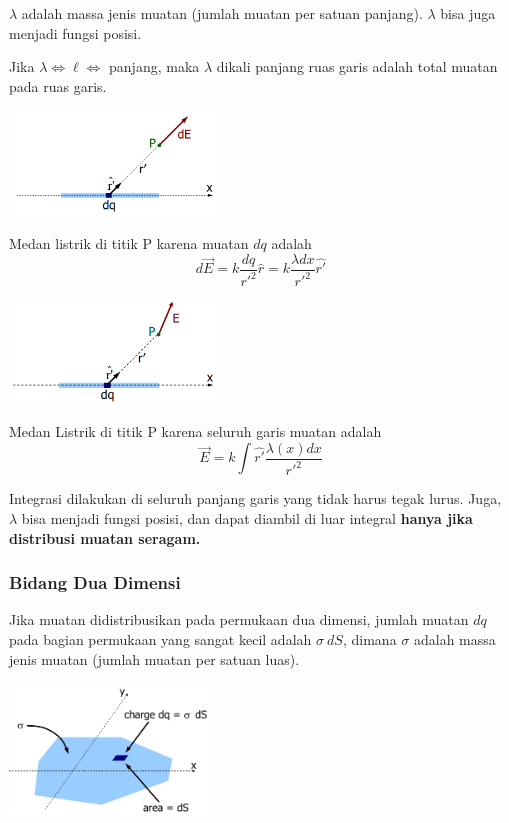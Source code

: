 \documentclass[twocolumn, 11pt]{article}%
\begin{document}
    $\lambda$ adalah massa jenis muatan (jumlah muatan per satuan panjang). $\lambda$ bisa juga menjadi fungsi posisi.

    Jika $\lambda \iff \ell \iff$ panjang, maka $\lambda$ dikali panjang ruas garis adalah total muatan pada ruas garis.

    \begin{center}
        \includegraphics[width=210px]{2.png}
    \end{center}

    Medan listrik di titik P karena muatan $dq$ adalah
    \[d\vec E=k \frac{dq}{r'^2} \hat r = k \frac{\lambda dx}{r'^2} \hat{r'} \]

    \begin{center}
        \includegraphics[width=210px]{3.png}
    \end{center}
    
    Medan Listrik di titik P karena seluruh garis muatan adalah
    \[\vec E=k \int \hat{r'} \frac{\lambda(x) dx}{r'^2} \]

    Integrasi dilakukan di seluruh panjang garis yang tidak harus tegak lurus. Juga, $\lambda$ bisa menjadi fungsi posisi, dan dapat diambil di luar integral \textbf{ hanya jika distribusi muatan seragam.}

    \subsubsection{Bidang Dua Dimensi}%
    Jika muatan didistribusikan pada permukaan dua dimensi, jumlah muatan $dq$ pada bagian permukaan yang sangat kecil adalah $\sigma\ dS$, dimana $\sigma$ adalah massa jenis muatan (jumlah muatan per satuan luas).

    \begin{center}
        \includegraphics[width=200px]{4.png} 
    \end{center}
\end{document}
